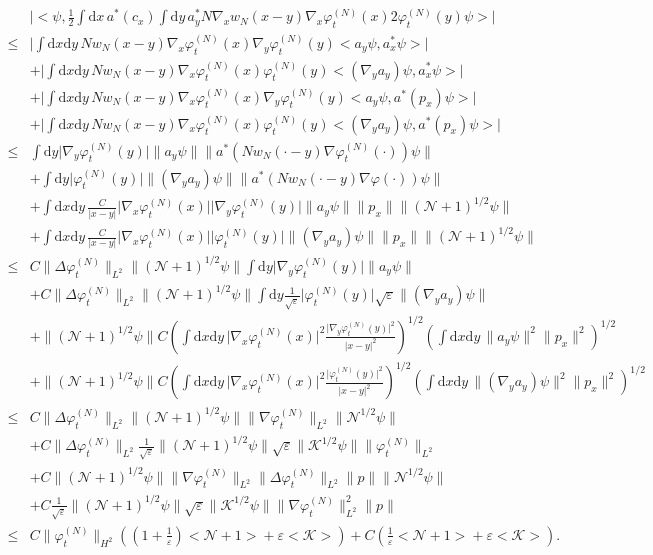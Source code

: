 \documentclass[11pt,a4paper]{scrartcl}
\newcommand{\di}{\textrm{d}}		%
\newcommand{\Ncal}{\mathcal{N}}		%
\newcommand{\Kcal}{\mathcal{K}}		%
\newcommand{\scal}[2]{\big<#1,#2\big>} %
\newcommand{\norm}[1]{\lVert#1\rVert}	%
\newcommand{\ev}[1]{\big<#1\big>}	%
\newcommand{\ph}{\varphi_t^{(N)}}	%
\begin{document}
\begin{align*}
& \lvert \scal{\psi}{\frac{1}{2}\int \di x\,a^\ast(c_x) \int \di y\,a^\ast_y N\nabla_x w_N(x-y)\nabla_x \ph(x) 2\ph(y) \psi}\rvert \\
\leq & \lvert \int \di x \di y\, Nw_N(x-y) \nabla_x \ph(x)  \nabla_y \ph(y) \scal{a_y\psi}{a^\ast_x\psi} \rvert \\
& + \lvert \int \di x \di y\,  Nw_N(x-y) \nabla_x \ph(x) \ph(y)  \scal{(\nabla_y a_y)\psi}{a^\ast_x \psi} \rvert \\
& + \lvert \int \di x \di y\, Nw_N(x-y) \nabla_x  \ph(x) \nabla_y \ph(y) \scal{a_y \psi}{a^\ast(p_x)\psi} \rvert \\
& + \lvert \int \di x \di y\, Nw_N(x-y) \nabla_x \ph(x) \ph(y) \scal{(\nabla_y a_y)\psi}{a^\ast(p_x)\psi} \rvert \\
\leq & \int \di y \lvert \nabla_y \ph(y)\rvert \norm{a_y \psi} \norm{a^\ast(Nw_N(\cdot -y)\nabla\ph(\cdot))\psi} \\
& + \int \di y \lvert \ph(y)\rvert \norm{(\nabla_y a_y)\psi} \norm{a^\ast(Nw_N(\cdot-y)\nabla\varphi(\cdot))\psi} \\
& + \int \di x\di y\, \frac{C}{\lvert x-y\rvert} \lvert \nabla_x\ph(x)\rvert \lvert \nabla_y \ph(y)\rvert \norm{a_y \psi} \norm{p_x} \norm{(\Ncal+1)^{1/2}\psi} \\
& + \int \di x\di y\, \frac{C}{\lvert x-y\rvert} \lvert \nabla_x\ph(x)\rvert \lvert \ph(y)\rvert \norm{(\nabla_y a_y)\psi} \norm{p_x} \norm{(\Ncal+1)^{1/2}\psi} \\
\leq & C \norm{\Delta\ph}_{L^2} \norm{(\Ncal+1)^{1/2}\psi} \int \di y \lvert \nabla_y \ph(y) \rvert \norm{a_y \psi} \\
& + C \norm{\Delta \ph}_{L^2} \norm{(\Ncal+1)^{1/2}\psi} \int \di y \frac{1}{\sqrt{\varepsilon}} \lvert \ph(y)\rvert \sqrt{\varepsilon} \norm{(\nabla_y a_y)\psi} \\
& + \norm{(\Ncal+1)^{1/2}\psi} C \left(\int \di x\di y\, \lvert \nabla_x\ph(x)\rvert^2 \frac{\lvert\nabla_y \ph(y)\rvert^2}{\lvert x-y \rvert^2} \right)^{1/2} \left(\int \di x\di y\, \norm{a_y \psi}^2 \norm{p_x}^2 \right)^{1/2} \\
& + \norm{(\Ncal+1)^{1/2}\psi} C \left(\int \di x\di y\, \lvert \nabla_x\ph(x)\rvert^2 \frac{\lvert \ph(y)\rvert^2}{\lvert x-y\rvert^2} \right)^{1/2} \left(\int \di x\di y\, \norm{(\nabla_y a_y)\psi}^2 \norm{p_x}^2 \right)^{1/2} \\
\leq & C \norm{\Delta \ph}_{L^2} \norm{(\Ncal+1)^{1/2}\psi} \norm{\nabla \ph}_{L^2} \norm{\Ncal^{1/2}\psi} \\
& + C\norm{\Delta \ph}_{L^2} \frac{1}{\sqrt{\varepsilon}} \norm{(\Ncal+1)^{1/2}\psi}  \sqrt{\varepsilon}\norm{\Kcal^{1/2}\psi} \norm{\ph}_{L^2} \\
& + C \norm{(\Ncal+1)^{1/2}\psi} \norm{\nabla \ph}_{L^2} \norm{\Delta \ph}_{L^2} \norm{p} \norm{\Ncal^{1/2}\psi} \\
& + C \frac{1}{\sqrt{\varepsilon}}\norm{(\Ncal+1)^{1/2}\psi} \sqrt{\varepsilon}\norm{\Kcal^{1/2}\psi} \norm{\nabla \ph}_{L^2}^2 \norm{p} \\
\leq & C \norm{\ph}_{H^2} \left( (1+\frac{1}{\varepsilon})\ev{\Ncal+1} + \varepsilon\ev{\Kcal} \right) + C \left( \frac{1}{\varepsilon}\ev{\Ncal+1} + \varepsilon \ev{\Kcal} \right).
\end{align*}
\end{document}

